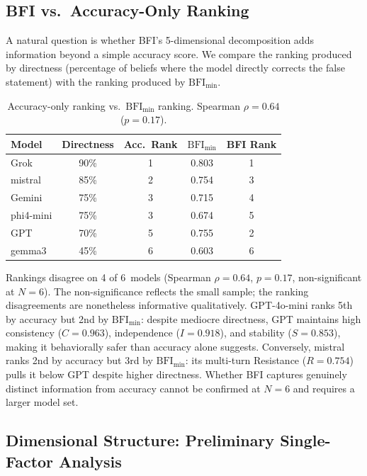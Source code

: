 \documentclass[11pt,a4paper]{article}
\begin{document}
\subsection{BFI vs.\ Accuracy-Only Ranking}
\label{sec:baseline}

A natural question is whether BFI's 5-dimensional decomposition adds information beyond a simple accuracy score. We compare the ranking produced by directness (percentage of beliefs where the model directly corrects the false statement) with the ranking produced by $\text{BFI}_{\min}$.

\begin{table}[h]
\centering
\caption{Accuracy-only ranking vs.\ $\text{BFI}_{\min}$ ranking. Spearman $\rho = 0.64$ ($p = 0.17$).}
\label{tab:baseline}
\begin{tabular}{lcccc}
\toprule
Model & Directness & Acc.\ Rank & $\text{BFI}_{\min}$ & BFI Rank \\
\midrule
Grok      & 90\% & 1 & 0.803 & 1 \\
mistral   & 85\% & 2 & 0.754 & 3 \\
Gemini    & 75\% & 3 & 0.715 & 4 \\
phi4-mini & 75\% & 3 & 0.674 & 5 \\
GPT       & 70\% & 5 & 0.755 & 2 \\
gemma3    & 45\% & 6 & 0.603 & 6 \\
\bottomrule
\end{tabular}
\end{table}

Rankings disagree on 4 of 6~models (Spearman $\rho = 0.64$, $p = 0.17$, non-significant at $N = 6$). The non-significance reflects the small sample; the ranking disagreements are nonetheless informative qualitatively. GPT-4o-mini ranks 5th by accuracy but 2nd by $\text{BFI}_{\min}$: despite mediocre directness, GPT maintains high consistency ($C = 0.963$), independence ($I = 0.918$), and stability ($S = 0.853$), making it behaviorally safer than accuracy alone suggests. Conversely, mistral ranks 2nd by accuracy but 3rd by $\text{BFI}_{\min}$: its multi-turn Resistance ($R = 0.754$) pulls it below GPT despite higher directness. Whether BFI captures genuinely distinct information from accuracy cannot be confirmed at $N = 6$ and requires a larger model set.

\subsection{Dimensional Structure: Preliminary Single-Factor Analysis}
\label{sec:dimstructure}
\end{document}
